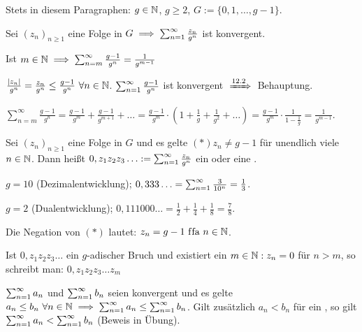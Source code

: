 \documentclass[a4paper,oneside,DIV15,BCOR12mm]{scrbook}
\begin{document}
\begin{vereinbarung}
Stets in diesem Paragraphen: $g\in\mathbb{N}$, $g\ge 2$, $G := \{0,1,\ldots,g-1\}$.
\end{vereinbarung}

\begin{satz}
\begin{liste}
\item Sei $(z_n)_{n\ge1}$ eine Folge in $G \implies \sum_{n=1}^{\infty}{\frac{z_n}{g^n}}$ ist konvergent.
\item Ist $m\in\mathbb{N} \implies \sum_{n=m}^\infty{\frac{g-1}{g^n}} = \frac{1}{g^{m-1}}$
\end{liste}
\end{satz}

\begin{beweise}
\item $\frac{|z_n|}{g^n} = \frac{z_n}{g^n} \le \frac{g-1}{g^n} \ \forall n\in\mathbb{N}$. $\sum_{n=1}^{\infty}{\frac{g-1}{g^n}}$ ist konvergent $\folgtnach{12.2}$ Behauptung.
\item $\sum_{n=m}^\infty\frac{g-1}{g^n} = \frac{g-1}{g^m} + \frac{g-1}{g^{m+1}} + \ldots = \frac{g-1}{g^m} \cdot ( 1+ \frac{1}{g} + \frac{1}{g^2} + \ldots ) = \frac{g-1}{g^m} \cdot \frac{1}{1-\frac{1}{g}} = \frac{1}{g^{m-1}}$.
\end{beweise}

\begin{definition}
Sei $(z_n)_{n\ge 1}$ eine Folge in  $G$ und es gelte $(*) z_n \ne g-1$ für unendlich viele $n\in\mathbb{N}$. Dann heißt $0,z_1z_2z_3\ldots := \sum_{n=1}^{\infty}{\frac{z_n}{g^n}}$ ein  oder eine .
\end{definition}

\begin{beispiele}
\item $g=10$ (Dezimalentwicklung); $0,333\ldots = \sum_{n=1}^{\infty}{\frac{3}{10^n}} = \frac{1}{3}$.
\item $g=2$ (Dualentwicklung); $0,111000\ldots = \frac{1}{2} + \frac{1}{4} + \frac{1}{8} = \frac{7}{8}$.
\end{beispiele}

\begin{bemerkung}
\begin{liste}
\item Die Negation von $(*)$ lautet: $z_n = g-1 \text{ f\/fa } n\in\mathbb{N}$.
\item Ist $0,z_1z_2z_3\ldots$ ein $g$-adischer Bruch und existiert ein $m\in\mathbb{N}: z_n = 0$ für $n>m$, so schreibt man: $0,z_1z_2z_3\ldots z_m$
\item $\sum_{n=1}^{\infty}{a_n}$ und $\sum_{n=1}^{\infty}{b_n}$ seien konvergent und es gelte $a_n \le b_n \ \forall n\in\mathbb{N} \implies \sum_{n=1}^{\infty}{a_n} \le \sum_{n=1}^{\infty}{b_n}$. Gilt zusätzlich $a_n<b_n$ für ein \natn, so gilt $\sum_{n=1}^{\infty}{a_n} < \sum_{n=1}^{\infty}{b_n}$ (Beweis in Übung).
\end{liste}
\end{bemerkung}
\end{document}
